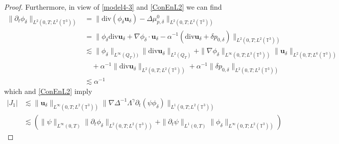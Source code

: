 \documentclass[reqno,a4paper,11pt]{amsart}
\theoremstyle{plain}
\numberwithin{equation}{section}
\begin{document}
\begin{proof}
				
				Furthermore, in view of \eqref{model4-3} and \eqref{ConEnL2} we can find
				\begin{align}\|\partial_{t}\phi_{\delta}\|_{L^{2}(0,T;L^{2}(\mathbb{T}^{3}))}&=\|\mathrm{div}(\phi_{\delta}  \mathbf{u}_{\delta})-\Delta\mu_{p,\delta}^{0}\|_{L^{2}(0,T;L^{2}(\mathbb{T}^{3}))}
					\nonumber\\&=\|\phi_{\delta}\mathrm{div}\mathbf{u}_{\delta}+\nabla\phi_{\delta}\cdot  \mathbf{u}_{\delta}-\alpha^{-1}(\mathrm{div}  \mathbf{u}_{\delta} +\delta p_{0,\delta})\|_{L^{2}(0,T;L^{2}(\mathbb{T}^{3}))}
					\nonumber\\&\lesssim \|\phi_{\delta}\|_{L^{\infty}(Q_T))}
					\|\mathrm{div}\mathbf{u}_{\delta}\|_{L^{2}(Q_T)}+\|\nabla\phi_{\delta}\|_{L^{\infty}(0,T;L^{3}(\mathbb{T}^{3}))}
					\|\mathbf{u}_{\delta}\|_{L^{2}(0,T;L^{6}(\mathbb{T}^{3}))}
					\nonumber\\& \quad+\alpha^{-1}\|\mathrm{div}  \mathbf{u}_{\delta}\|_{L^{2}(0,T;L^{2}(\mathbb{T}^{3}))}
					+\alpha^{-1}\|\delta p_{0,\delta}\|_{L^{2}(0,T;L^{2}(\mathbb{T}^{3}))}
					\nonumber\\&\lesssim \alpha^{-1}                  \label{uniform phi-alpha}
				\end{align}  which and \eqref{ConEnL2} imply
				\begin{align}
					\label{lemh55-7}
					\nonumber  |J_{1}|&
					\lesssim \|\mathbf{u}_{\delta}\|_{L^{\infty}(0,T;L^{2}(\mathbb{T}^{3}))}\|\nabla\Delta^{-1}\Lambda^{\gamma}\partial_t (\psi\phi_{\delta})\|_{L^{1}(0,T;L^{2}(\mathbb{T}^{3}))}
					\\& \nonumber\lesssim (\|\psi\|_{L^{\infty}(0,T)}\|\partial_t \phi_{\delta}\|_{L^{2}(0,T;L^{2}(\mathbb{T}^{3}))}+\|\partial_t\psi\|_{L^{1}(0,T)}\|\phi_{\delta}\|_{L^{\infty}(0,T;L^{2}(\mathbb{T}^{3}))})

\end{align}
\end{proof}
\end{document}
